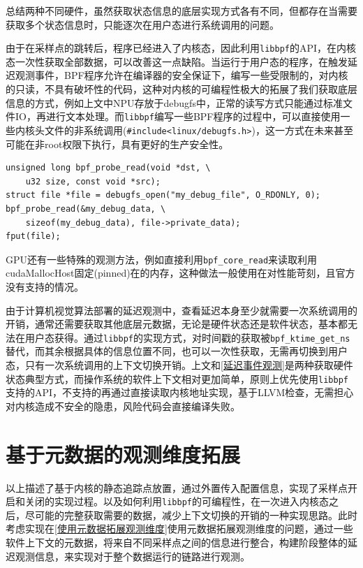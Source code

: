 \documentclass[master]{shtthesis}
\begin{document}
总结两种不同硬件，虽然获取状态信息的底层实现方式各有不同，但都存在当需要获取多个状态信息时，只能逐次在用户态进行系统调用的问题。

由于在采样点的跳转后，程序已经进入了内核态，因此利用\verb*|libbpf|的API，在内核态一次性获取全部数据，可以改善这一点缺陷。当运行于用户态的程序，在触发延迟观测事件，BPF程序允许在编译器的安全保证下，编写一些受限制的，对内核的只读，不具有破坏性的代码，这种对内核的可编程性极大的拓展了我们获取底层信息的方式，例如上文中NPU存放于debugfs中，正常的读写方式只能通过标准文件IO，再进行文本处理。而\verb*|libbpf|编写一些BPF程序的过程中，可以直接使用一些内核头文件的非系统调用(\verb*|#include<linux/debugfs.h>|)，这一方式在未来甚至可能在非root权限下执行，具有更好的生产安全性。

\begin{lstlisting}[caption={使用非系统调用方式读取debugfs},captionpos=b]
unsigned long bpf_probe_read(void *dst, \
	u32 size, const void *src);
struct file *file = debugfs_open("my_debug_file", O_RDONLY, 0);
bpf_probe_read(&my_debug_data, \
	sizeof(my_debug_data), file->private_data);
fput(file);
\end{lstlisting}

GPU还有一些特殊的观测方法，例如直接利用\verb*|bpf_core_read|来读取利用cudaMallocHost固定(pinned)在的内存，这种做法一般使用在对性能苛刻，且官方没有支持的情况。

由于计算机视觉算法部署的延迟观测中，查看延迟本身至少就需要一次系统调用的开销，通常还需要获取其他底层元数据，无论是硬件状态还是软件状态，基本都无法在用户态获得。通过\verb*|libbpf|的实现方式，对时间戳的获取被\verb*|bpf_ktime_get_ns|替代，而其余根据具体的信息位置不同，也可以一次性获取，无需再切换到用户态，只有一次系统调用的上下文切换开销。上文和\ref{延迟事件观测}是两种获取硬件状态典型方式，而操作系统的软件上下文相对更加简单，原则上优先使用\verb*|libbpf|支持的API，不支持的再通过直接读取内核地址实现，基于LLVM检查，无需担心对内核造成不安全的隐患，风险代码会直接编译失败。


\section{基于元数据的观测维度拓展}\label{基于元数据的观测维度拓展}
以上描述了基于内核的静态追踪点放置，通过外置传入配置信息，实现了采样点开启和关闭的实现过程。以及如何利用\verb*|libbpf|的可编程性，在一次进入内核态之后，尽可能的完整获取需要的数据，减少上下文切换的开销的一种实现思路。此时考虑实现在\ref{使用元数据拓展观测维度}使用元数据拓展观测维度的问题，通过一些软件上下文的元数据，将来自不同采样点之间的信息进行整合，构建阶段整体的延迟观测信息，来实现对于整个数据运行的链路进行观测。
\end{document}

